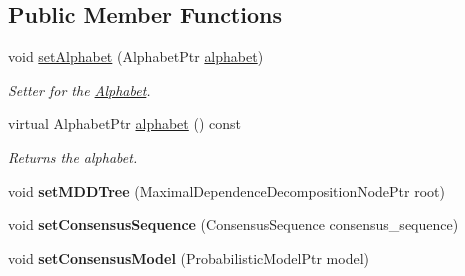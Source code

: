 \subsection*{Public Member Functions}
\begin{DoxyCompactItemize}
\item 
\mbox{\label{classtops_1_1MaximalDependenceDecomposition_afa369733fda96d62999f4221f1a574cb}} 
void \hyperlink{classtops_1_1MaximalDependenceDecomposition_afa369733fda96d62999f4221f1a574cb}{set\+Alphabet} (Alphabet\+Ptr \hyperlink{classtops_1_1MaximalDependenceDecomposition_af0f9784f56be8ae810466de09786d1cf}{alphabet})
\begin{DoxyCompactList}\small\item\em Setter for the \hyperlink{classtops_1_1Alphabet}{Alphabet}. \end{DoxyCompactList}\item 
\mbox{\label{classtops_1_1MaximalDependenceDecomposition_af0f9784f56be8ae810466de09786d1cf}} 
virtual Alphabet\+Ptr \hyperlink{classtops_1_1MaximalDependenceDecomposition_af0f9784f56be8ae810466de09786d1cf}{alphabet} () const
\begin{DoxyCompactList}\small\item\em Returns the alphabet. \end{DoxyCompactList}\item 
\mbox{\label{classtops_1_1MaximalDependenceDecomposition_a3b340d8f864664bf7b9efaa3063b8b9b}} 
void {\bfseries set\+M\+D\+D\+Tree} (Maximal\+Dependence\+Decomposition\+Node\+Ptr root)
\item 
\mbox{\label{classtops_1_1MaximalDependenceDecomposition_af6a4e2470180b747d939edfff839d688}} 
void {\bfseries set\+Consensus\+Sequence} (Consensus\+Sequence consensus\+\_\+sequence)
\item 
\mbox{\label{classtops_1_1MaximalDependenceDecomposition_ac0e860c8101228474eea7274531ee996}} 
void {\bfseries set\+Consensus\+Model} (Probabilistic\+Model\+Ptr model)
\item 
\mbox{\label{classtops_1_1MaximalDependenceDecomposition_a09b92cc404ab17d880b407c7839986a3}} 

\end{DoxyCompactItemize}
